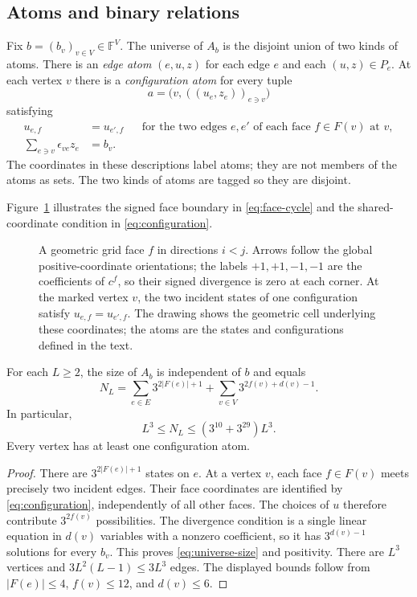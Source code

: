 \subsection{Atoms and binary relations}

Fix $b=(b_v)_{v\in V}\in\mathbb F^V$.  The universe of $A_b$ is the
disjoint union of two kinds of atoms.  There is an \emph{edge atom}
$(e,u,z)$ for each edge $e$ and each $(u,z)\in P_e$.  At each vertex $v$
there is a \emph{configuration atom} for every tuple
\[
 a=\bigl(v,((u_e,z_e))_{e\ni v}\bigr)
\]
satisfying
\begin{equation}\label{eq:configuration}
 \begin{aligned}
 u_{e,f}&=u_{e',f}
       &&\text{for the two edges $e,e'$ of each face $f\in F(v)$ at $v$},\\
 \sum_{e\ni v}\epsilon_{ve}z_e&=b_v.
 \end{aligned}
\end{equation}
The coordinates in these descriptions label atoms; they are not members
of the atoms as sets.  The two kinds of atoms are tagged so they are
disjoint.

Figure~\ref{fig:unit-face} illustrates the signed face boundary in
\eqref{eq:face-cycle} and the shared-coordinate condition in
\eqref{eq:configuration}.
\begin{figure}[t]
\centering

\caption{A geometric grid face $f$ in directions $i<j$. Arrows follow the
global positive-coordinate orientations; the labels $+1,+1,-1,-1$ are
the coefficients of $c^f$, so their signed divergence is zero at each
corner. At the marked vertex $v$, the two incident states of one
configuration satisfy $u_{e,f}=u_{e',f}$. The drawing shows the geometric
cell underlying these coordinates; the atoms are the states and
configurations defined in the text.}
\label{fig:unit-face}
\end{figure}

\begin{lemma}\label{lem:universe-size}
For each $L\ge2$, the size of $A_b$ is independent of $b$ and equals
\begin{equation}\label{eq:universe-size}
 N_L=\sum_{e\in E}3^{2|F(e)|+1}
       +\sum_{v\in V}3^{2f(v)+d(v)-1}.
\end{equation}
In particular,
\[
 L^3\le N_L\le (3^{10}+3^{29})L^3.
\]
Every vertex has at least one configuration atom.
\end{lemma}
\begin{proof}
There are $3^{2|F(e)|+1}$ states on $e$.  At a vertex $v$, each face
$f\in F(v)$ meets precisely two incident edges.  Their face coordinates
are identified by \eqref{eq:configuration}, independently of all other
faces.  The choices of $u$ therefore contribute $3^{2f(v)}$ possibilities.
The divergence condition is a single linear equation in $d(v)$ variables
with a nonzero coefficient, so it has $3^{d(v)-1}$ solutions for every
$b_v$.  This proves \eqref{eq:universe-size} and positivity.  There are
$L^3$ vertices and $3L^2(L-1)\le3L^3$ edges.  The displayed bounds follow
from $|F(e)|\le4$, $f(v)\le12$, and $d(v)\le6$.
\end{proof}

